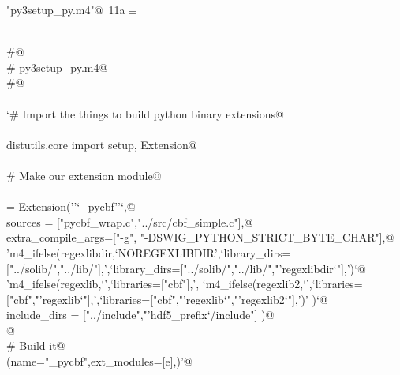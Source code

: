 \documentclass[10pt,a4paper,twoside,notitlepage]{article}
\begin{document}
\begin{flushleft} \small
\begin{minipage}{\linewidth}\label{scrap9}\raggedright\small
{} \verb@"py3setup_py.m4"@\nobreak\ {\footnotesize {11a}}$\equiv$
\vspace{-1ex}
\begin{list}{}{} \item
\mbox{}\verb@@\\
\mbox{}\verb@#@\\
\mbox{}\verb@#  py3setup_py.m4@\\
\mbox{}\verb@#@\\
\mbox{}\verb@@\\
\mbox{}\verb@`# Import the things to build python binary extensions@\\
\mbox{}\verb@@\\
\mbox{}\verb@from distutils.core import setup, Extension@\\
\mbox{}\verb@@\\
\mbox{}\verb@# Make our extension module@\\
\mbox{}\verb@@\\
\mbox{}\verb@e = Extension(''`_pycbf''`,@\\
\mbox{}\verb@              sources = ["pycbf_wrap.c","../src/cbf_simple.c"],@\\
\mbox{}\verb@         extra_compile_args=["-g", "-DSWIG_PYTHON_STRICT_BYTE_CHAR"],@\\
\mbox{}\verb@         'm4_ifelse(regexlibdir,`NOREGEXLIBDIR',`library_dirs=["../solib/","../lib/"],',`library_dirs=["../solib/","../lib/","'regexlibdir`"],')`@\\
\mbox{}\verb@         'm4_ifelse(regexlib,`',`libraries=["cbf"],', `m4_ifelse(regexlib2,`',`libraries=["cbf","'regexlib`"],',`libraries=["cbf","'regexlib`","'regexlib2`"],')'  )`@\\
\mbox{}\verb@         include_dirs = ["../include","'hdf5_prefix`/include"] )@\\
\mbox{}\verb@            @\\
\mbox{}\verb@# Build it@\\
\mbox{}\verb@setup(name="_pycbf",ext_modules=[e],)'@\\
\mbox{}\verb@@{\NWsep}
\end{list}
\vspace{-1.5ex}
\footnotesize
\begin{list}{}{\setlength{\itemsep}{-\parsep}\setlength{\itemindent}{-\leftmargin}}

\item{}
\end{list}
\end{minipage}\vspace{4ex}
\end{flushleft}
\end{document}
